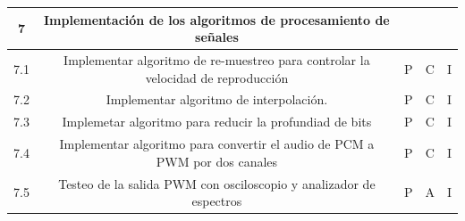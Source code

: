 \documentclass[11pt]{charter}
\begin{document}
\begin{table}[]
\begin{tabular}{|c|c|c|c|c|}
\rowcolor[HTML]{CBCEFB} 
7                                                                                              & Implementación de los algoritmos de procesamiento de señales                       &                                                                             &                                                                    &                                                                      \\ \hline
7.1                                                                                            & Implementar algoritmo de re-muestreo para controlar la velocidad de reproducción   & P                                                                           & C                                                                  & I                                                                    \\ \hline
7.2                                                                                            & Implementar algoritmo de interpolación.                                            & P                                                                           & C                                                                  & I                                                                    \\ \hline
7.3                                                                                            & Implemetar algoritmo para reducir la profundiad de bits                            & P                                                                           & C                                                                  & I                                                                    \\ \hline
7.4                                                                                            & Implementar algoritmo para convertir el audio de PCM a PWM por dos canales         & P                                                                           & C                                                                  & I                                                                    \\ \hline
7.5                                                                                            & Testeo de la salida PWM con osciloscopio y analizador de espectros                 & P                                                                           & A                                                                  & I                                                                    \\ \hline

\end{tabular}
\end{table}
\end{document}
